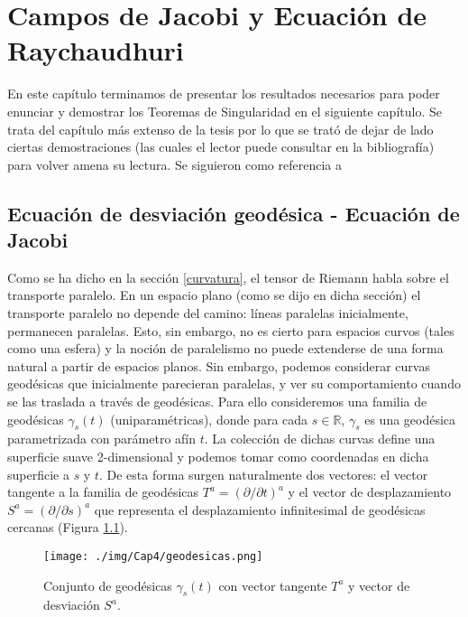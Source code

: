 ﻿\chapter{Campos de Jacobi y Ecuación de Raychaudhuri}\label{capitulo Jacobi}

En este capítulo terminamos de presentar los resultados necesarios para poder enunciar y demostrar los Teoremas de Singularidad en el siguiente capítulo. Se trata del capítulo más extenso de la tesis por lo que se trató de dejar de lado ciertas demostraciones (las cuales el lector puede consultar en la bibliografía) para volver amena su lectura. Se siguieron como referencia a \citep{Carroll,1984ucp..book.....W,1975lsss.book.....H,Penrose}






\section{Ecuación de desviación geodésica - Ecuación de Jacobi}\label{ec. desviacion geodesica}

Como se ha dicho en la sección \ref{curvatura}, el tensor de Riemann habla sobre el transporte paralelo. En un espacio plano (como se dijo en dicha sección) el transporte paralelo no depende del camino: líneas paralelas inicialmente, permanecen paralelas. Esto, sin embargo, no es cierto para espacios curvos (tales como una esfera) y la noción de paralelismo no puede extenderse de una forma natural a partir de espacios planos. Sin embargo, podemos considerar curvas geodésicas que inicialmente parecieran paralelas, y ver su comportamiento cuando se las traslada a través de geodésicas. Para ello consideremos una familia de geodésicas $\gamma_s(t)$ (uniparamétricas), donde para cada $s\in \mathbb{R}$, $\gamma_s$ es una geodésica parametrizada con parámetro afín $t$. La colección de dichas curvas define una superficie suave 2-dimensional y podemos tomar como coordenadas en dicha superficie a $s$ y $t$. De esta forma surgen naturalmente dos vectores: el vector tangente a la familia de geodésicas $T^a=(\partial/\partial t)^a$ y el vector de desplazamiento $S^a=(\partial/\partial s)^a$ que representa el desplazamiento infinitesimal de geodésicas cercanas (Figura \ref{fig_geodesicas}).

\begin{figure}[H]
    \centering
    \texttt{[image: ./img/Cap4/geodesicas.png]}
    \caption{Conjunto de geodésicas $\gamma_s(t)$ con vector tangente $T^a$ y vector de desviación $S^a$.}
    \label{fig_geodesicas}
\end{figure}
    


